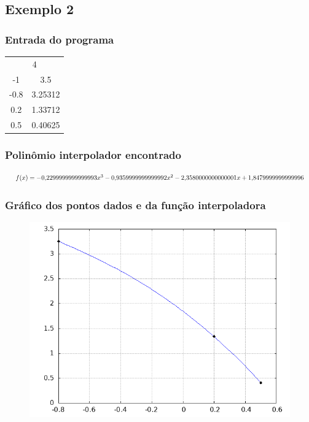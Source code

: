 \documentclass{article}
\begin{document}
    \subsection{Exemplo 2}

            \subsubsection{Entrada do programa}
            \begin{table}[ht!]
                \centering
                \begin{tabular}{cc}
                    \multicolumn{2}{c}{4} \\
                    -1   & 3.5 \\
                    -0.8 & 3.25312 \\
                    0.2  & 1.33712 \\
                    0.5  & 0.40625 \\
                \end{tabular}
            \end{table}


            \subsubsection{Polinômio interpolador encontrado}
            \begin{equation*}
                \resizebox{\textwidth}{!}{$
                f(x) = -0{,}2299999999999993x^3 - 0{,}9359999999999992x^2 - 2{,}3580000000000001x + 1{,}8479999999999996
                $}
            \end{equation*}


            \subsubsection{Gráfico dos pontos dados e da função interpoladora}
                \begin{figure}[H]
                    \centering
                    \includegraphics[width=0.5\linewidth]{exemplo2.png}
                    \label{fig:placeholder2}
                \end{figure}
\end{document}
